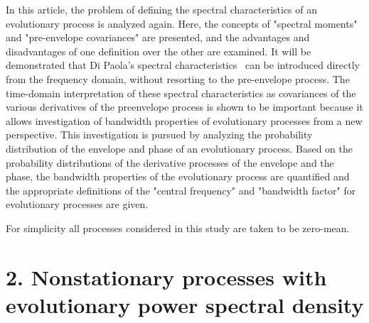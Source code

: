 \documentclass[12pt]{article}
\begin{document}
In this article, the problem of defining the spectral characteristics of an evolutionary process is analyzed again. Here, the concepts of "spectral moments" and "pre-envelope covariances" are presented, and the advantages and disadvantages of one definition over the other are examined. It will be demonstrated that Di Paola's spectral characteristics~\cite{DiPaola1985} can be introduced directly from the frequency domain, without resorting to the pre-envelope process. The time-domain interpretation of these spectral characteristics as covariances of the various derivatives of the preenvelope process is shown to be important because it allows investigation of bandwidth properties of evolutionary processes from a new perspective. This investigation is pursued by analyzing the probability distribution of the envelope and phase of an evolutionary process. Based on the probability distributions of the derivative processes of the envelope and the phase, the bandwidth properties of the evolutionary process are quantified and the appropriate definitions of the "central frequency" and "bandwidth factor" for evolutionary processes are given.

For simplicity all processes considered in this study are taken to be zero-mean.

\section*{2. Nonstationary processes with evolutionary power spectral density}
\end{document}
